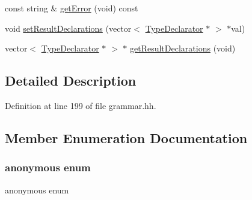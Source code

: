 \begin{DoxyCompactItemize}
\item 
const string \& \mbox{\hyperlink{class_c_parse_a7541bb4f0e8b8eb2cf95b744f61fa219}{get\+Error}} (void) const
\item 
void \mbox{\hyperlink{class_c_parse_a0174a660f08394d7735f5699ce969cd5}{set\+Result\+Declarations}} (vector$<$ \mbox{\hyperlink{class_type_declarator}{Type\+Declarator}} $\ast$ $>$ $\ast$val)
\item 
vector$<$ \mbox{\hyperlink{class_type_declarator}{Type\+Declarator}} $\ast$ $>$ $\ast$ \mbox{\hyperlink{class_c_parse_a6bfe0c19992dba09ecdd7aeda385ab38}{get\+Result\+Declarations}} (void)
\end{DoxyCompactItemize}


\subsection{Detailed Description}


Definition at line 199 of file grammar.\+hh.



\subsection{Member Enumeration Documentation}
\mbox{\label{class_c_parse_ae8e1e345251de33336c7fe9ccfbadc0b}} 
\subsubsection{\texorpdfstring{anonymous enum}{anonymous enum}}
{\footnotesize\ttfamily anonymous enum}

